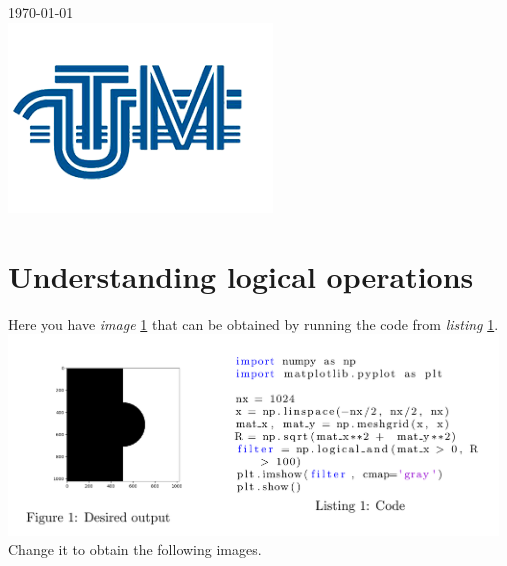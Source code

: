 \documentclass{article}
\begin{document}
\begin{titlepage}
    {\large \today}\\[2cm] %

    \includegraphics[width=7cm]{utm2.png}\\[1cm] %


    \vfill %

  \end{titlepage}


  \newpage


  \section{Understanding logical operations}
    Here you have \textit{image} \underline{1} that can be obtained by running
    the code from \textit{listing} \underline{1}.\\
    \includegraphics[width=13cm]{ex1.png}
    Change it to obtain the following images.\\
\end{document}
